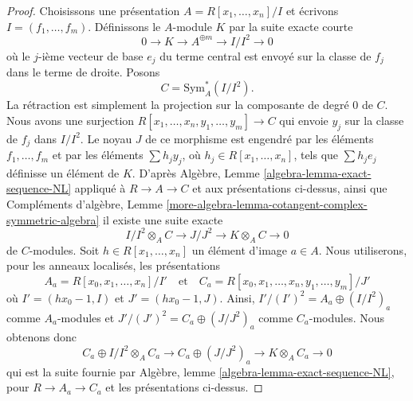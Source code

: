 \begin{proof}
Choisissons une présentation $A = R[x_1, \ldots, x_n]/I$ et écrivons
$I = (f_1, \ldots, f_m)$. Définissons le $A$-module $K$ par la suite exacte courte
$$
0 \to K \to A^{\oplus m} \to I/I^2 \to 0
$$
où le $j$-ième vecteur de base $e_j$ du terme central est envoyé sur la classe de
$f_j$ dans le terme de droite. Posons
$$
C = \text{Sym}^*_A(I/I^2).
$$
La rétraction est simplement la projection sur la composante de degré $0$ de
$C$. Nous avons une surjection
$R[x_1, \ldots, x_n, y_1, \ldots, y_m] \to C$ qui envoie $y_j$ sur la classe de
$f_j$ dans $I/I^2$. Le noyau $J$ de ce morphisme est engendré par les éléments
$f_1, \ldots, f_m$ et par les éléments $\sum h_j y_j$, où
$h_j \in R[x_1, \ldots, x_n]$, tels que $\sum h_j e_j$ définisse un élément de
$K$. D'après
Algèbre, Lemme \ref{algebra-lemma-exact-sequence-NL}
appliqué à $R \to A \to C$ et aux présentations ci-dessus, ainsi que
Compléments d'algèbre, Lemme
\ref{more-algebra-lemma-cotangent-complex-symmetric-algebra}
il existe une suite exacte
\begin{equation}
\label{equation-sequence}
I/I^2 \otimes_A C \to J/J^2 \to K \otimes_A C \to 0
\end{equation}
de $C$-modules. Soit $h \in R[x_1, \ldots, x_n]$ un élément d'image $a \in A$.
Nous utiliserons, pour les anneaux localisés, les présentations
$$
A_a = R[x_0, x_1, \ldots, x_n]/I'
\quad\text{et}\quad
C_a = R[x_0, x_1, \ldots, x_n, y_1, \ldots, y_m]/J'
$$
où $I' = (hx_0 - 1, I)$ et $J' = (hx_0 - 1, J)$. Ainsi,
$I'/(I')^2 = A_a \oplus (I/I^2)_a$ comme $A_a$-modules et
$J'/(J')^2 = C_a \oplus (J/J^2)_a$ comme $C_a$-modules.
Nous obtenons donc
\begin{equation}
\label{equation-sequence-localized}
C_a \oplus I/I^2 \otimes_A C_a \to
C_a \oplus (J/J^2)_a \to
K \otimes_A C_a \to 0
\end{equation}
qui est la suite fournie par
Algèbre, lemme \ref{algebra-lemma-exact-sequence-NL},
pour $R \to A_a \to C_a$ et les présentations ci-dessus.


\end{proof}
